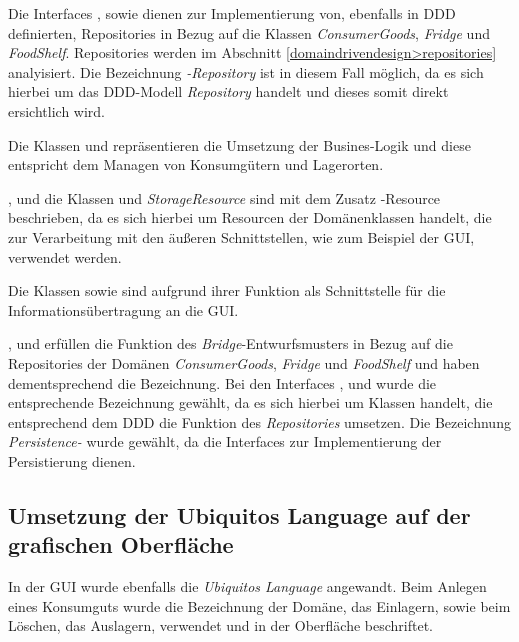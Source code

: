 Die Interfaces \href{}{}, \href{}{} sowie \href{}{} dienen zur Implementierung von, ebenfalls in \ac{DDD} definierten, Repositories in Bezug auf die Klassen \href{}{\code{}}\textit{ConsumerGoods}, \href{}{\code{}}\textit{Fridge} und \href{}{\code{}}\textit{FoodShelf}.
Repositories werden im Abschnitt \ref{domaindrivendesign>repositories} analyisiert.
Die Bezeichnung \textit{-Repository} ist in diesem Fall möglich, da es sich hierbei um das \ac{DDD}-Modell \textit{Repository} handelt und dieses somit direkt ersichtlich wird.

Die Klassen \href{}{} und \href{}{} repräsentieren die Umsetzung der Busines-Logik und diese entspricht dem Managen von Konsumgütern und Lagerorten. 

\href{}{}, \href{}{} und die Klassen \href{}{} und \textit{StorageResource} sind mit dem Zusatz -Resource beschrieben, da es sich hierbei um Resourcen der Domänenklassen handelt, die zur Verarbeitung mit den äußeren Schnittstellen, wie zum Beispiel der \ac{GUI}, verwendet werden.

Die Klassen \href{}{} sowie \href{}{} sind aufgrund ihrer Funktion als Schnittstelle für die Informationsübertragung an die GUI.

\href{}{}, \href{}{} und \href{}{} erfüllen die Funktion des \textit{Bridge}-Entwurfsmusters in Bezug auf die Repositories der Domänen \textit{ConsumerGoods}, \textit{Fridge} und \textit{FoodShelf} und haben dementsprechend die Bezeichnung.
Bei den Interfaces \href{}{}, \href{}{} und \href{}{} wurde die entsprechende Bezeichnung gewählt, da es sich hierbei um Klassen handelt, die entsprechend dem \ac{DDD} die Funktion des \textit{Repositories} umsetzen.
Die Bezeichnung \textit{Persistence-} wurde gewählt, da die Interfaces zur Implementierung der Persistierung dienen.

\subsection*{Umsetzung der Ubiquitos Language auf der grafischen Oberfläche}
In der GUI wurde ebenfalls die \textit{Ubiquitos Language} angewandt.
Beim Anlegen eines Konsumguts wurde die Bezeichnung der Domäne, das Einlagern, sowie beim Löschen, das Auslagern, verwendet und in der Oberfläche beschriftet.

